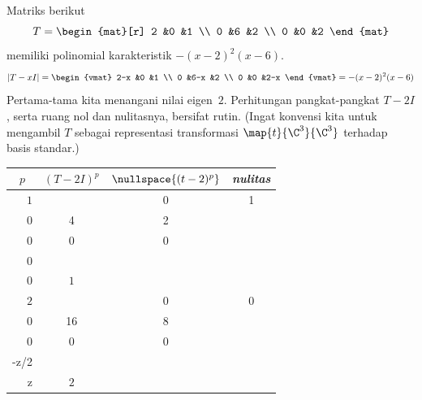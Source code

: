 \begin{example} \label{ex:FirstJordForm}
Matriks berikut
\begin{equation*}
   T=
   \begin{mat}[r]
     2  &0  &1  \\
     0  &6  &2  \\
     0  &0  &2
   \end{mat}
\end{equation*}
memiliki polinomial karakteristik \( -(x-2)^2(x-6) \).
\begin{equation*}
   |T-xI|=
   \begin{vmat}
     2-x  &0    &1  \\
     0    &6-x  &2  \\
     0    &0    &2-x
   \end{vmat}
   =-(x-2)^2(x-6)
\end{equation*}
Pertama-tama kita menangani nilai eigen~$2$.
Perhitungan pangkat-pangkat $T-2I$, serta ruang nol dan nulitasnya,
bersifat rutin.
(Ingat konvensi kita untuk
mengambil $T$ sebagai representasi transformasi $\map{t}{\C^3}{\C^3}$
terhadap basis standar.)
\begin{center}
  \renewcommand{\arraystretch}{1.25}
  \begin{tabular}{r|ccc} 
    \multicolumn{1}{c}{\( p \)}  
         &\( (T-2I)^p \) &\( \nullspace{(t-2)^p}  \) 
         &\textit{nulitas}                                            \\  
    \hline
    \( 1 \)
    &\matrixvenlarge{\begin{mat}[r]
          0  &0  &1  \\
          0  &4  &2  \\
          0  &0  &0
        \end{mat}}
    &\( \set{\matrixvenlarge{\colvec{x \\ 0 \\ 0}}
         \suchthat x\in\C}  \)  
    &$1$                                                   \\
    \( 2 \)
    &\matrixvenlarge{\begin{mat}[r]
          0  &0  &0  \\
          0  &16 &8  \\
          0  &0  &0
        \end{mat}}
    &\( \set{\matrixvenlarge{\colvec{x \\ -z/2 \\  z}}
               \suchthat x,z\in\C}  \) 
    &$2$                                                   \\

\end{tabular}
\end{center}
\end{example}
